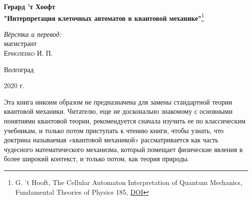 \documentclass[aps,%
12pt,%
final,%
oneside,
onecolumn,%
musixtex, %
superscriptaddress,%
centertags]{article} %
\begin{document}
\begin{titlepage} 
\begin{center}

\textbf{\Large Герард ’т Хоофт}\\[0.5cm]
\textbf{\LARGE "Интерпретация клеточных автоматов в квантовой механике"}\footnote{G. 't Hooft, The Cellular Automaton Interpretation of Quantum Mechanics,
Fundamental Theories of Physics 185, \href{https://doi.org/10.1007/978-3-319-41285-6_2}{DOI}}\\[3.0cm]


\begin{flushright} \large
\emph{Вёрстка и перевод:} \\
магистрант \\
\textsc{Ермоленко И. П.}
\end{flushright}


\vfill 

{\large {Волгоград}} \par
{\large {2020 г.}}
\end{center} 
\end{titlepage}

\newcommand{\openxs}{\newpage Данная глава распространяется в соответствии с условиями международной лицензии Creative Commons Attribution 4.0 International License (http://creativecommons.org/licenses/by/4.0/), которая разрешает использование, копирование, адаптацию, распространение и воспроизведение на любом носителе или в любом формате, при условии, что вы укажете автора(ов) и источник, предоставите ссылку на лицензию Creative Commons и укажете все внесенные изменения.
Изображения или другие материалы третьих лиц, представленные в данной главе, включены в лицензию Creative Commons, если не указано иное; если такой материал не включен в лицензию Creative Commons и соответствующее действие не разрешено нормативным актом, пользователям необходимо будет получить разрешение владельца лицензии на копирование, адаптацию или воспроизведение материала.\newpage}



Эта книга никоим образом не предназначена для замены стандартной теории квантовой механики. Читателю, еще не досконально знакомому с основными понятиями квантовой теории, рекомендуется сначала изучить ее по классическим учебникам, и только потом приступать к чтению книги, чтобы узнать, что доктрина называемая «квантовой механикой» рассматривается как часть чудесного математического механизма, который помещает физические явления в более широкий контекст, и только потом, как теория природы. 
\end{document}
